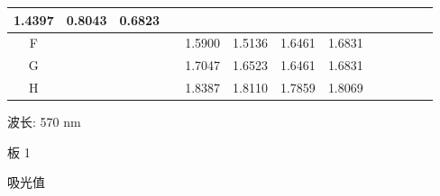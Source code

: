 \documentclass[UTF8,10pt,a4paper,fontset=fandol]{ctexart}
\newcommand{\fieldvalue}[1]{#1}
\begin{document}
\begin{center}
\begin{tabular}{c|c|c|c|c|c|c|c|c|c|c|c|c}
\fieldvalue{1.4397}&
\fieldvalue{0.8043}&
\fieldvalue{0.6823}&&&\\ \hline
F&&&&
\fieldvalue{1.5900}&
\fieldvalue{1.5136}&
\fieldvalue{1.6461}&
\fieldvalue{1.6831}&&&\\ \hline
G&&&&
\fieldvalue{1.7047}&
\fieldvalue{1.6523}&
\fieldvalue{1.6461}&
\fieldvalue{1.6831}&&&\\ \hline
H&&&&
\fieldvalue{1.8387}&
\fieldvalue{1.8110}&
\fieldvalue{1.7859}&
\fieldvalue{1.8069}&&&
\end{tabular}
\end{center}

\noindent
波长: 570 nm

\noindent
板 1

\noindent
吸光值
\end{document}
